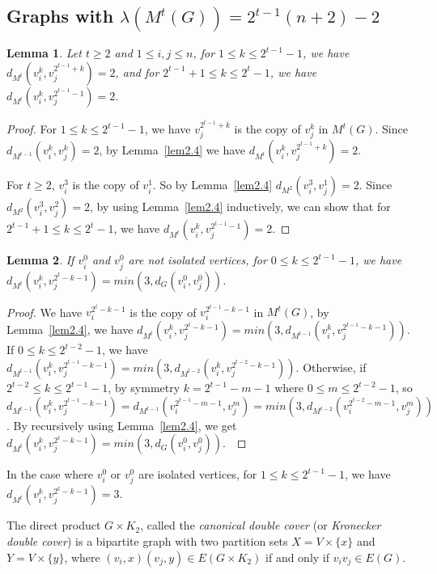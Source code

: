 \documentclass{article}
\newtheorem{lemma} {Lemma}
\newtheorem{open problem} {Open Problem}
\numberwithin{lemma}{section}
\numberwithin{theorem}{section}
\numberwithin{cor}{section}
\numberwithin{prop}{section}
\numberwithin{con}{section}
\numberwithin{claim}{section}
\numberwithin{obs}{section}
\numberwithin{dnt}{section}
\begin{document}
\subsection{Graphs with $\lambda(M^t(G))=2^{t-1}(n+2)-2$ }
\begin{lemma}\label{lem4.2}
	Let $t\geq 2$ and $1\leq i,j\leq n$, for $1\leq k\leq 2^{t-1}-1 $, we have $d_{M^t}(v_i^{k},v_j^{2^{t-1}+k})=2$, and for $2^{t-1}+1\leq k \leq 2^t-1$, we have $d_{M^t}(v_i^{k},v_j^{2^{t-1}-1})=2$.
\end{lemma}
\begin{proof}
	For $1\leq k\leq 2^{t-1}-1 $, we have $v_j^{2^{t-1}+k}$ is the copy of $v_j^k$ in $M^t(G)$. Since $d_{M^{t-1}}(v_i^k,v_j^k)=2$, by Lemma~\ref{lem2.4} we have $d_{M^t}(v_i^{k},v_j^{2^{t-1}+k})=2$.\par
	For $t\geq 2$, $v^3_i$ is the copy of $v^1_i$. So by Lemma~\ref{lem2.4} $d_{M^2}(v_i^3,v_j^1)=2$. Since $d_{M^2}(v_i^3,v_j^2)=2$,  by using Lemma~\ref{lem2.4} inductively,  we can show that  for $2^{t-1}+1\leq k \leq 2^t-1$, we have $d_{M^t}(v_i^{k},v_j^{2^{t-1}-1})=2$.   
\end{proof} 
\begin{lemma}\label{lem4.3}
	If $v^0_i$ and $v^0_j$ are not isolated vertices, for $0\leq k\leq 2^{t-1}-1 $, we have $d_{M^t}(v_i^{k},v_j^{2^t-k-1})=min(3,d_G(v_i^0,v_j^0)) $.
\end{lemma}
\begin{proof}
	We have $v_i^{2^t-k-1}$ is the copy of $v_i^{2^{t-1}-k-1}$ in $M^t(G)$, by Lemma~\ref{lem2.4}, we have $d_{M^t}(v_i^k,v_j^{2^t-k-1})=min(3,d_{M^{t-1}}(v_i^k,v_j^{2^{t-1}-k-1})) $. If $0\leq k\leq 2^{t-2}-1$, we have $d_{M^{t-1}}(v_i^k,v_j^{2^{t-1}-k-1})=min(3,d_{M^{t-2}}(v_i^k,v_j^{2^{t-2}-k-1})) $. Otherwise, if $2^{t-2}\leq k\leq 2^{t-1}-1$, by symmetry $k=2^{t-1}-m-1$ where $0\leq m\leq 2^{t-2}-1$, so  $d_{M^{t-1}}(v_i^k,v_j^{2^{t-1}-k-1})=d_{M^{t-1}}(v_i^{2^{t-1}-m-1},v_j^m)=min(3,d_{M^{t-2}}(v_i^{2^{t-2}-m-1},v_j^m)) $. By recursively using Lemma~\ref{lem2.4}, we get $d_{M^t}(v_i^{k},v_j^{2^t-k-1})=min(3,d_G(v_i^0,v_j^0))$.~ \end{proof} 
In the case where $v^0_i$ or $v^0_j$ are isolated vertices,  for $1\leq k\leq 2^{t-1}-1$, we have $d_{M^t}(v_i^{k},v_j^{2^t-k-1})=3$.\par 
The direct product $G\times K_2$, called the \textit{canonical double cover} (or \textit{Kronecker double cover}) is a bipartite graph with two partition sets $X=V\times \{x\}$ and $Y=V\times \{y\}$, where $(v_i,x)(v_j,y) \in E(G\times K_2)$ if and only if $v_iv_j\in E(G)$.\par
\end{document}
